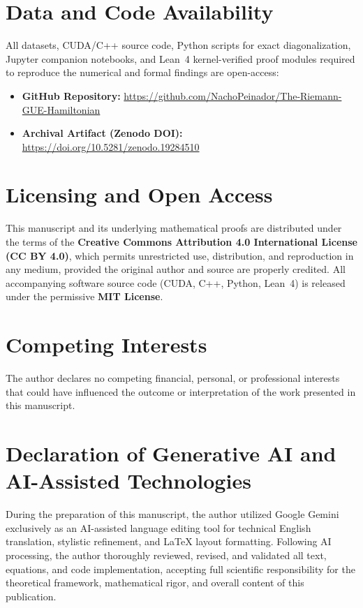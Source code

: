 \documentclass[11pt,a4paper]{article}
\begin{document}
\section*{Data and Code Availability}
All datasets, CUDA/C++ source code, Python scripts for exact diagonalization, Jupyter companion notebooks, and Lean~4 kernel-verified proof modules required to reproduce the numerical and formal findings are open-access:
\begin{itemize}
    \item \textbf{GitHub Repository:} \url{https://github.com/NachoPeinador/The-Riemann-GUE-Hamiltonian}
    \item \textbf{Archival Artifact (Zenodo DOI):} \url{https://doi.org/10.5281/zenodo.19284510}
\end{itemize}

\section*{Licensing and Open Access}
This manuscript and its underlying mathematical proofs are distributed under the terms of the \textbf{Creative Commons Attribution 4.0 International License (CC BY 4.0)}, which permits unrestricted use, distribution, and reproduction in any medium, provided the original author and source are properly credited. All accompanying software source code (CUDA, C++, Python, Lean~4) is released under the permissive \textbf{MIT License}.

\section*{Competing Interests}
The author declares no competing financial, personal, or professional interests that could have influenced the outcome or interpretation of the work presented in this manuscript.

\section*{Declaration of Generative AI and AI-Assisted Technologies}
During the preparation of this manuscript, the author utilized Google Gemini exclusively as an AI-assisted language editing tool for technical English translation, stylistic refinement, and LaTeX layout formatting. Following AI processing, the author thoroughly reviewed, revised, and validated all text, equations, and code implementation, accepting full scientific responsibility for the theoretical framework, mathematical rigor, and overall content of this publication.
\end{document}
